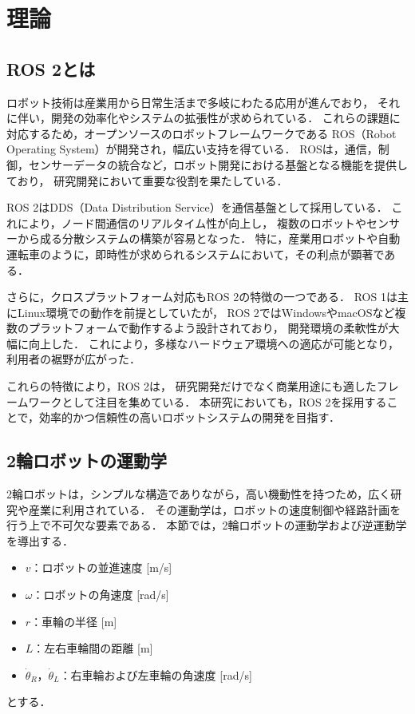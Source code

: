 
\section{理論}
\subsection{ROS 2とは}
ロボット技術は産業用から日常生活まで多岐にわたる応用が進んでおり，
それに伴い，開発の効率化やシステムの拡張性が求められている．
これらの課題に対応するため，オープンソースのロボットフレームワークである
ROS（Robot Operating System）が開発され，幅広い支持を得ている．
ROSは，通信，制御，センサーデータの統合など，ロボット開発における基盤となる機能を提供しており，
研究開発において重要な役割を果たしている．

ROS 2はDDS（Data Distribution Service）を通信基盤として採用している．
これにより，ノード間通信のリアルタイム性が向上し，
複数のロボットやセンサーから成る分散システムの構築が容易となった\cite{ros2design}．
特に，産業用ロボットや自動運転車のように，即時性が求められるシステムにおいて，その利点が顕著である．

さらに，クロスプラットフォーム対応もROS 2の特徴の一つである．
ROS 1は主にLinux環境での動作を前提としていたが，
ROS 2ではWindowsやmacOSなど複数のプラットフォームで動作するよう設計されており，
開発環境の柔軟性が大幅に向上した\cite{ros2docs}．
これにより，多様なハードウェア環境への適応が可能となり，利用者の裾野が広がった．

これらの特徴により，ROS 2は，
研究開発だけでなく商業用途にも適したフレームワークとして注目を集めている．
本研究においても，ROS 2を採用することで，効率的かつ信頼性の高いロボットシステムの開発を目指す．

\subsection{2輪ロボットの運動学}
2輪ロボットは，シンプルな構造でありながら，高い機動性を持つため，広く研究や産業に利用されている．
その運動学は，ロボットの速度制御や経路計画を行う上で不可欠な要素である．
本節では，2輪ロボットの運動学および逆運動学を導出する．

\begin{itemize}
    \item $v$：ロボットの並進速度 [m/s]
    \item $\omega$：ロボットの角速度 [rad/s]
    \item $r$：車輪の半径 [m]
    \item $L$：左右車輪間の距離 [m]
    \item $\dot{\theta}_R$，$\dot{\theta}_L$：右車輪および左車輪の角速度 [rad/s]
\end{itemize}
とする．

